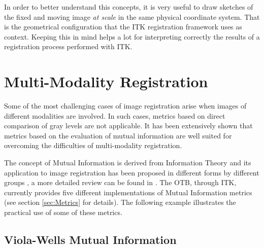 In order to better understand this concepts, it is very useful to draw sketches
of the fixed and moving image {\em at scale} in the same physical coordinate
system. That is the geometrical configuration that the ITK registration
framework uses as context. Keeping this in mind helps a lot for interpreting
correctly the results of a registration process performed with ITK.




\section{Multi-Modality Registration}
\label{sec:MultiModalityRegistration}

Some of the most challenging cases of image registration arise when images of
different modalities are involved. In such cases, metrics based on direct
comparison of gray levels are not applicable. It has been extensively shown
that metrics based on the evaluation of mutual information are well suited for
overcoming the difficulties of multi-modality registration.


The concept of Mutual Information is derived from Information Theory and its
application to image registration has been proposed in different forms by
different groups \cite{Collignon1995,Maes97,Viola1997}, a more detailed review
can be found in \cite{ingtgrs04}. The OTB, through ITK, currently
provides five different implementations of Mutual Information metrics (see
section \ref{sec:Metrics} for details). The following example illustrates the
practical use of some of these metrics.

\subsection{Viola-Wells Mutual Information}
\label{sec:MultiModalityRegistrationViolaWells}




